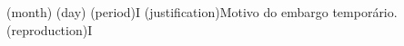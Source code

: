 
\ulfmvdocemxadate(month){}
\ulfmvdocemxadate(day){}
\ulfmvavailability(period){I}%
\ulfmvavailability(justification){Motivo do embargo temporário.}
\ulfmvavailability(reproduction){I}%
